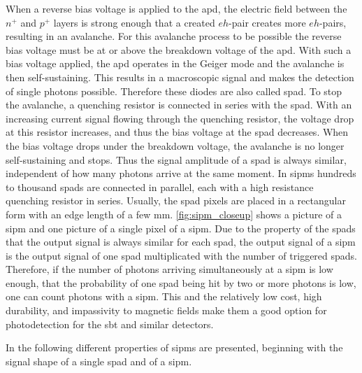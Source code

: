 When a reverse bias voltage is applied to the \ac{apd}, the electric field between the $n^+$ and $p^+$ layers is strong enough that a created $eh$-pair creates more $eh$-pairs, resulting in an avalanche.
For this avalanche process to be possible the reverse bias voltage must be at or above the breakdown voltage of the \ac{apd}.
With such a bias voltage applied, the \ac{apd} operates in the Geiger mode and the avalanche is then self-sustaining.
This results in a macroscopic signal and makes the detection of single photons possible.
Therefore these diodes are also called \ac{spad}.
To stop the avalanche, a quenching resistor is connected in series with the \ac{spad}.
With an increasing current signal flowing through the quenching resistor, the voltage drop at this resistor increases, and thus the bias voltage at the \ac{spad} decreases.
When the bias voltage drops under the breakdown voltage, the avalanche is no longer self-sustaining and stops.
Thus the signal amplitude of a \ac{spad} is always similar, independent of how many photons arrive at the same moment.
In \acp{sipm} hundreds to thousand \acp{spad} are connected in parallel, each with a high resistance quenching resistor in series. 
Usually, the \ac{spad} pixels are placed in a rectangular form with an edge length of a few \si{\milli\meter}.
\autoref{fig:sipm_closeup} shows a picture of a \ac{sipm} and one picture of a single pixel of a \ac{sipm}.
Due to the property of the \acp{spad} that the output signal is always similar for each \ac{spad}, the output signal of a \ac{sipm} is the output signal of one \ac{spad} multiplicated with the number of triggered \acp{spad}.
Therefore, if the number of photons arriving simultaneously at a \ac{sipm} is low enough, that the probability of one \ac{spad} being hit by two or more photons is low, one can count photons with a \ac{sipm}.
This and the relatively low cost, high durability, and impassivity to magnetic fields make them a good option for photodetection for the \ac{sbt} and similar detectors.

In the following different properties of \acp{sipm} are presented, beginning with the signal shape of a single \ac{spad} and of a \ac{sipm}.


